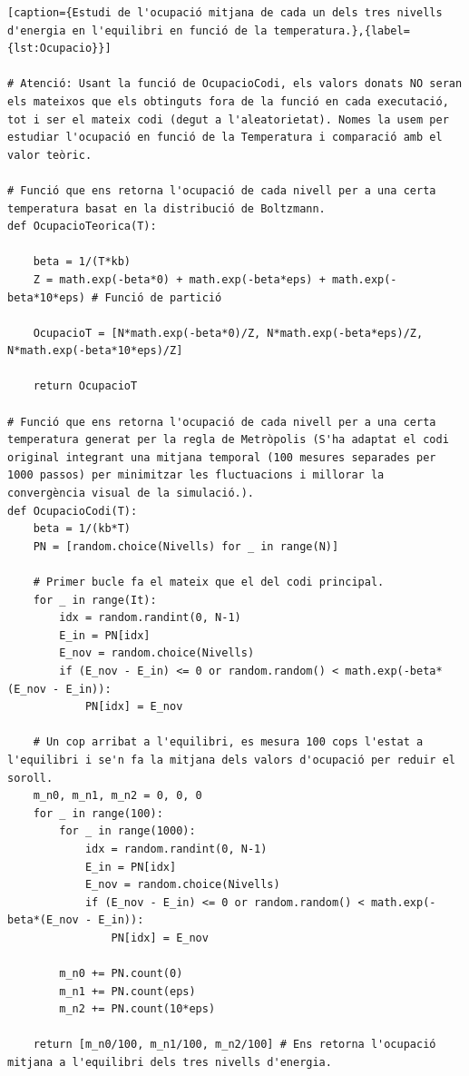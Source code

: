\documentclass[a4paper,10.5pt]{report}
\begin{document}
\begin{lstlisting}[caption={Estudi de l'ocupació mitjana de cada un dels tres nivells d'energia en l'equilibri en funció de la temperatura.},{label={lst:Ocupacio}}]
	
# Atenció: Usant la funció de OcupacioCodi, els valors donats NO seran els mateixos que els obtinguts fora de la funció en cada executació, tot i ser el mateix codi (degut a l'aleatorietat). Nomes la usem per estudiar l'ocupació en funció de la Temperatura i comparació amb el valor teòric. 

# Funció que ens retorna l'ocupació de cada nivell per a una certa temperatura basat en la distribució de Boltzmann.
def OcupacioTeorica(T): 

	beta = 1/(T*kb)
	Z = math.exp(-beta*0) + math.exp(-beta*eps) + math.exp(-beta*10*eps) # Funció de partició 

	OcupacioT = [N*math.exp(-beta*0)/Z, N*math.exp(-beta*eps)/Z, 	N*math.exp(-beta*10*eps)/Z]
	
	return OcupacioT

# Funció que ens retorna l'ocupació de cada nivell per a una certa temperatura generat per la regla de Metròpolis (S'ha adaptat el codi original integrant una mitjana temporal (100 mesures separades per 1000 passos) per minimitzar les fluctuacions i millorar la convergència visual de la simulació.). 
def OcupacioCodi(T):
	beta = 1/(kb*T)
	PN = [random.choice(Nivells) for _ in range(N)]

	# Primer bucle fa el mateix que el del codi principal. 
	for _ in range(It): 
		idx = random.randint(0, N-1)
		E_in = PN[idx]
		E_nov = random.choice(Nivells)
		if (E_nov - E_in) <= 0 or random.random() < math.exp(-beta*(E_nov - E_in)):
			PN[idx] = E_nov

	# Un cop arribat a l'equilibri, es mesura 100 cops l'estat a l'equilibri i se'n fa la mitjana dels valors d'ocupació per reduir el soroll. 
	m_n0, m_n1, m_n2 = 0, 0, 0
	for _ in range(100):
		for _ in range(1000):
			idx = random.randint(0, N-1)
			E_in = PN[idx]
			E_nov = random.choice(Nivells)
			if (E_nov - E_in) <= 0 or random.random() < math.exp(-beta*(E_nov - E_in)):
				PN[idx] = E_nov
	
		m_n0 += PN.count(0)
		m_n1 += PN.count(eps)
		m_n2 += PN.count(10*eps)
	
	return [m_n0/100, m_n1/100, m_n2/100] # Ens retorna l'ocupació mitjana a l'equilibri dels tres nivells d'energia. 
	
	
\end{lstlisting}
\end{document}
